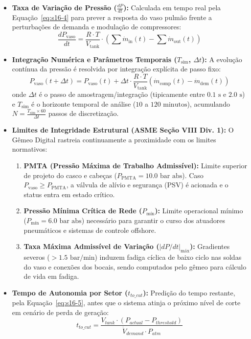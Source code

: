 \documentclass[12pt,a4paper]{article}
\numberwithin{equation}{section}
\numberwithin{table}{section}
\numberwithin{figure}{section}
\begin{document}
\begin{itemize}
	\item \textbf{Taxa de Variação de Pressão ($\frac{dP}{dt}$):}
	Calculada em tempo real pela Equação~\eqref{eq:s16-4} para prever a resposta do vaso pulmão frente a perturbações de demanda e modulação de compressores:
	\begin{equation}\label{eq:s16-4}
\frac{dP_{\text{vaso}}}{dt} = \frac{R \cdotp T}{V_{\text{tank}}} \cdotp \left( \sum \dot{m}_{\text{in}}(t) - \sum \dot{m}_{\text{out}}(t) \right)
\end{equation}
	\item \textbf{Integração Numérica e Parâmetros Temporais ($T_{\text{sim}}$, $\Delta t$):}
	A evolução contínua da pressão é resolvida por integração explícita de passo fixo:
	\begin{equation}\label{eq:s16-4b}
P_{\text{vaso}}(t + \Delta t) = P_{\text{vaso}}(t) + \Delta t \cdot \frac{R \cdot T}{V_{\text{tank}}} \left( \dot{m}_{\text{comp}}(t) - \dot{m}_{\text{dem}}(t) \right)
\end{equation}
	onde $\Delta t$ é o passo de amostragem/integração (tipicamente entre $0.1\text{ s}$ e $2.0\text{ s}$) e $T_{\text{sim}}$ é o horizonte temporal de análise ($10$ a $120\text{ minutos}$), acumulando $N = \frac{T_{\text{sim}} \times 60}{\Delta t}$ passos de discretização.
	\item \textbf{Limites de Integridade Estrutural (ASME Seção VIII Div. 1):}
	O Gêmeo Digital rastreia continuamente a proximidade com os limites normativos:
	\begin{enumerate}
		\item \textbf{PMTA (Pressão Máxima de Trabalho Admissível):} Limite superior de projeto do casco e cabeças ($P_{\text{PMTA}} = 10.0\text{ bar abs}$). Caso $P_{\text{vaso}} \ge P_{\text{PMTA}}$, a válvula de alívio e segurança (PSV) é acionada e o status entra em estado crítico.
		\item \textbf{Pressão Mínima Crítica de Rede ($P_{\text{mín}}$):} Limite operacional mínimo ($P_{\text{mín}} = 6.0\text{ bar abs}$) necessário para garantir o curso dos atuadores pneumáticos e sistemas de controle offshore.
		\item \textbf{Taxa Máxima Admissível de Variação ($|dP/dt|_{\text{máx}}$):} Gradientes severos ($> 1.5\text{ bar/min}$) induzem fadiga cíclica de baixo ciclo nas soldas do vaso e conexões dos bocais, sendo computados pelo gêmeo para cálculo de vida em fadiga.
	\end{enumerate}
	\item \textbf{Tempo de Autonomia por Setor ($t_{to\_cut}$):}
	Predição do tempo restante, pela Equação~\eqref{eq:s16-5}, antes que o sistema atinja o próximo nível de corte em cenário de perda de geração:
	\begin{equation}\label{eq:s16-5}
t_{to\_cut} = \frac{V_{tank} \cdotp (P_{actual} - P_{threshold})}{\dot{V}_{demand} \cdotp P_{atm}}
\end{equation}
\end{itemize}
\end{document}
